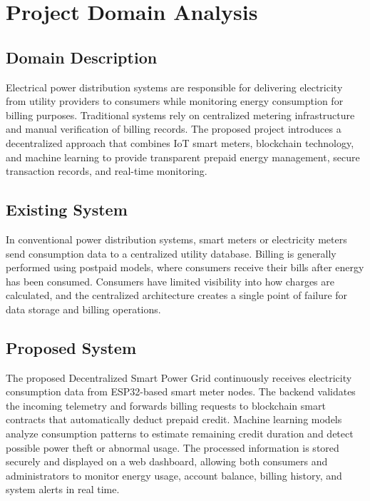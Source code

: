 \section{Project Domain Analysis}

\subsection{Domain Description}

Electrical power distribution systems are responsible for delivering
electricity from utility providers to consumers while monitoring energy
consumption for billing purposes. Traditional systems rely on centralized
metering infrastructure and manual verification of billing records. The
proposed project introduces a decentralized approach that combines IoT
smart meters, blockchain technology, and machine learning to provide
transparent prepaid energy management, secure transaction records, and
real-time monitoring.

\subsection{Existing System}

In conventional power distribution systems, smart meters or electricity
meters send consumption data to a centralized utility database. Billing
is generally performed using postpaid models, where consumers receive
their bills after energy has been consumed. Consumers have limited
visibility into how charges are calculated, and the centralized
architecture creates a single point of failure for data storage and
billing operations.

\subsection{Proposed System}

The proposed Decentralized Smart Power Grid continuously receives
electricity consumption data from ESP32-based smart meter nodes. The
backend validates the incoming telemetry and forwards billing requests
to blockchain smart contracts that automatically deduct prepaid credit.
Machine learning models analyze consumption patterns to estimate
remaining credit duration and detect possible power theft or abnormal
usage. The processed information is stored securely and displayed on a
web dashboard, allowing both consumers and administrators to monitor
energy usage, account balance, billing history, and system alerts in
real time.